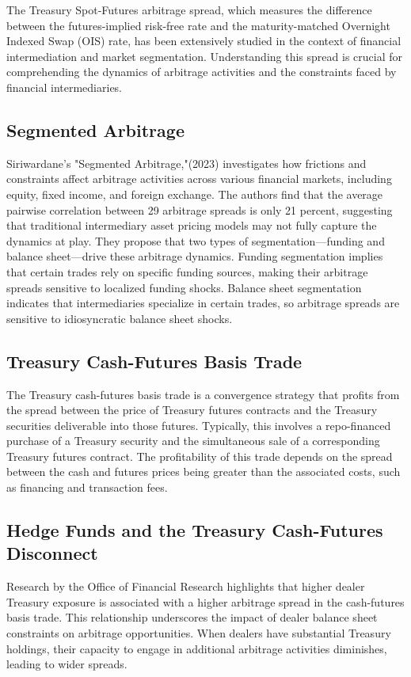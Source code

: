 \documentclass{article}
\begin{document}
The Treasury Spot-Futures arbitrage spread, which measures the difference between the futures-implied risk-free rate and the maturity-matched Overnight Indexed Swap (OIS) rate, has been extensively studied in the context of financial intermediation and market segmentation. Understanding this spread is crucial for comprehending the dynamics of arbitrage activities and the constraints faced by financial intermediaries.​

\subsection{Segmented Arbitrage}
Siriwardane's "Segmented Arbitrage,"(2023) investigates how frictions and constraints affect arbitrage activities across various financial markets, including equity, fixed income, and foreign exchange. The authors find that the average pairwise correlation between 29 arbitrage spreads is only 21 percent, suggesting that traditional intermediary asset pricing models may not fully capture the dynamics at play. They propose that two types of segmentation—funding and balance sheet—drive these arbitrage dynamics. Funding segmentation implies that certain trades rely on specific funding sources, making their arbitrage spreads sensitive to localized funding shocks. Balance sheet segmentation indicates that intermediaries specialize in certain trades, so arbitrage spreads are sensitive to idiosyncratic balance sheet shocks. ​
\subsection{Treasury Cash-Futures Basis Trade}
The Treasury cash-futures basis trade is a convergence strategy that profits from the spread between the price of Treasury futures contracts and the Treasury securities deliverable into those futures. Typically, this involves a repo-financed purchase of a Treasury security and the simultaneous sale of a corresponding Treasury futures contract. The profitability of this trade depends on the spread between the cash and futures prices being greater than the associated costs, such as financing and transaction fees. ​
\subsection{Hedge Funds and the Treasury Cash-Futures Disconnect}
Research by the Office of Financial Research highlights that higher dealer Treasury exposure is associated with a higher arbitrage spread in the cash-futures basis trade. This relationship underscores the impact of dealer balance sheet constraints on arbitrage opportunities. When dealers have substantial Treasury holdings, their capacity to engage in additional arbitrage activities diminishes, leading to wider spreads. ​
\end{document}
